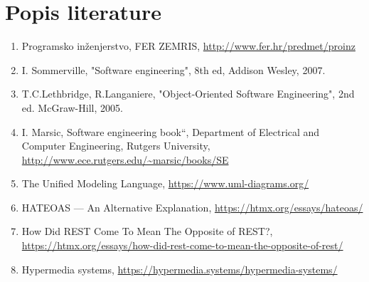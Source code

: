 \chapter*{Popis literature}
		
		\begin{enumerate}
			
			
			\item  Programsko inženjerstvo, FER ZEMRIS, \url{http://www.fer.hr/predmet/proinz}
			
			\item  I. Sommerville, "Software engineering", 8th ed, Addison Wesley, 2007.
			
			\item  T.C.Lethbridge, R.Langaniere, "Object-Oriented Software Engineering", 2nd ed. McGraw-Hill, 2005.
			
			\item  I. Marsic, Software engineering book``, Department of Electrical and Computer Engineering, Rutgers University, \url{http://www.ece.rutgers.edu/~marsic/books/SE}
			
			\item  The Unified Modeling Language, \url{https://www.uml-diagrams.org/}
			
			\item  HATEOAS — An Alternative Explanation, \url{https://htmx.org/essays/hateoas/}
			\item  How Did REST Come To Mean The Opposite of REST?, \url{https://htmx.org/essays/how-did-rest-come-to-mean-the-opposite-of-rest/}
			\item  Hypermedia systems,  \url{https://hypermedia.systems/hypermedia-systems/}
		\end{enumerate}
		
		 